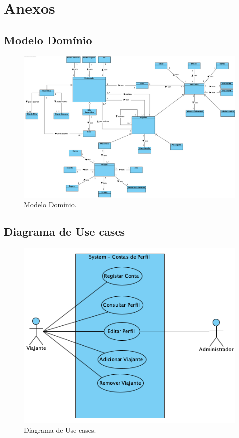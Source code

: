 \chapter{Anexos}
\section{Modelo Domínio}
\begin{figure}[H]
    \centering
	\includegraphics[scale=0.55]{imagens/modelo-dominio.png}
	\caption{Modelo Domínio.}
	\label{img:pag}
\end{figure}

\section{Diagrama de Use cases}

\begin{figure}[H]
    \centering
	\includegraphics[scale=0.70]{imagens/diagrama-use-cases-1.png}
	\caption{Diagrama de Use cases.}
	\label{img:pag}
\end{figure}


